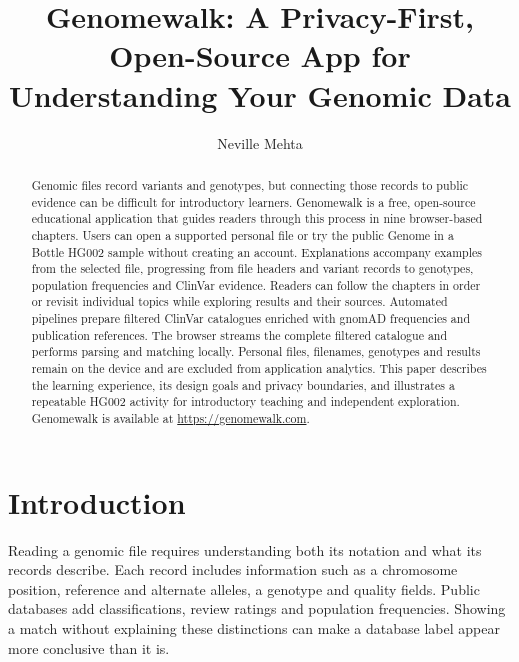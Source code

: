 \documentclass[runningheads]{llncs}
\begin{document}
\title{Genomewalk: A Privacy-First, Open-Source App for Understanding Your Genomic Data}
\author{Neville Mehta}
\maketitle

\begin{abstract}
Genomic files record variants and genotypes, but connecting those records to public evidence can be difficult for introductory learners. Genomewalk is a free, open-source educational application that guides readers through this process in nine browser-based chapters. Users can open a supported personal file or try the public Genome in a Bottle HG002 sample without creating an account. Explanations accompany examples from the selected file, progressing from file headers and variant records to genotypes, population frequencies and ClinVar evidence. Readers can follow the chapters in order or revisit individual topics while exploring results and their sources. Automated pipelines prepare filtered ClinVar catalogues enriched with gnomAD frequencies and publication references. The browser streams the complete filtered catalogue and performs parsing and matching locally. Personal files, filenames, genotypes and results remain on the device and are excluded from application analytics. This paper describes the learning experience, its design goals and privacy boundaries, and illustrates a repeatable HG002 activity for introductory teaching and independent exploration. Genomewalk is available at \url{https://genomewalk.com}.
\end{abstract}

\section{Introduction}
Reading a genomic file requires understanding both its notation and what its records describe. Each record includes information such as a chromosome position, reference and alternate alleles, a genotype and quality fields. Public databases add classifications, review ratings and population frequencies. Showing a match without explaining these distinctions can make a database label appear more conclusive than it is.
\end{document}
